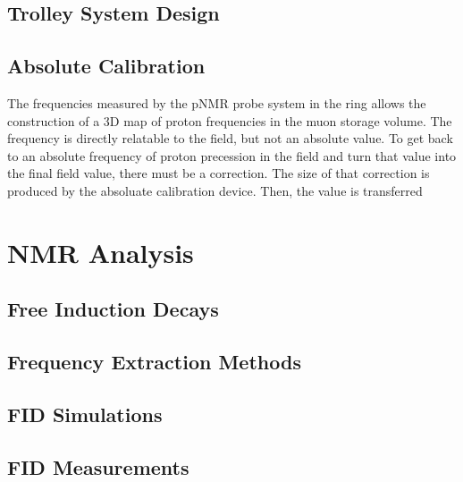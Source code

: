 
\subsection{Trolley System Design}


\subsection{Absolute Calibration}

The frequencies measured by the pNMR probe system in the ring allows the construction of a 3D map of proton frequencies in the muon storage volume.  The frequency is directly relatable to the field, but not an absolute value.  To get back to an absolute frequency of proton precession in the field and turn that value into the final field value, there must be a correction.  The size of that correction is produced by the absoluate calibration device.  Then, the value is transferred 

\section{NMR Analysis}
\subsection{Free Induction Decays}

\subsection{Frequency Extraction Methods}

\subsection{FID Simulations}

\subsection{FID Measurements}

